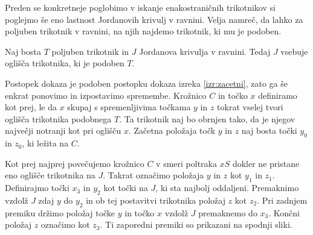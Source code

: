 \documentclass[mat1]{fmfdelo}
\begin{document}
Preden se konkretneje poglobimo v iskanje enakostraničnih trikotnikov si poglejmo še eno lastnost Jordanovih krivulj v ravnini. Velja namreč, da lahko za poljuben trikotnik v ravnini, na njih najdemo trikotnik, ki mu je podoben.
\begin{trditev}\label{trd:trik_poljuben}
Naj bosta $T$ poljuben trikotnik in $J$ Jordanova krivulja v ravnini. Tedaj $J$ vsebuje oglišča trikotnika, ki je podoben $T$.
\end{trditev}
\proof
Postopek dokaza je podoben postopku dokaza izreka \ref{izr:zacetni}, zato ga še enkrat ponovimo in izpostavimo spremembe. Krožnico $C$ in točko $x$ definiramo kot prej, le da $x$ skupaj s spremenljivima točkama $y$ in $z$ tokrat vselej tvori oglišča trikotnika podobnega $T$. Ta trikotnik naj bo obrnjen tako, da je njegov največji notranji kot pri oglišču $x$. Začetna položaja točk $y$ in $z$ naj bosta točki $y_0$ in $z_0$, ki ležita na $C$. 


Kot prej najprej povečujemo krožnico $C$ v smeri poltraka $xS$ dokler ne pristane eno oglišče trikotnika na $J$. Takrat označimo položaja $y$ in $z$ kot $y_1$ in $z_1$. Definirajmo točki $x_3$ in $y_2$ kot točki na $J$, ki sta najbolj oddaljeni. Premaknimo vzdolž $J$ zdaj $y$ do $y_2$ in ob tej postavitvi trikotnika položaj $z$ kot $z_2$. Pri zadnjem premiku držimo položaj točke $y$ in točko $x$ vzdolž $J$ premaknemo do $x_3$. Končni položaj $z$ označimo kot $z_3$. Ti zaporedni premiki so prikazani na spodnji sliki.
\end{document}
